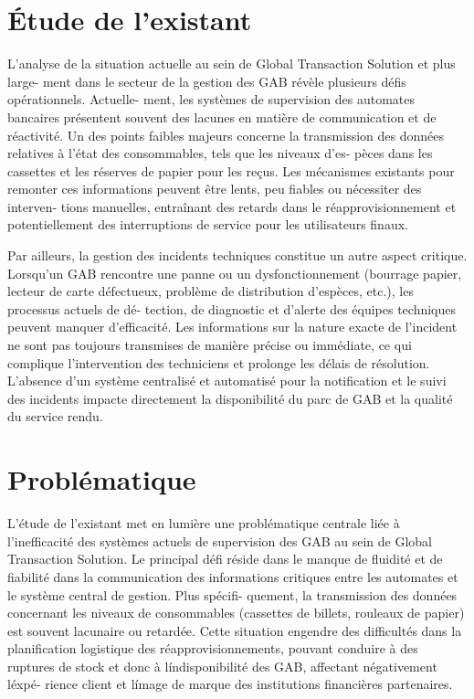 \documentclass[a4paper,15pt]{report}
\begin{document}
	
	\section{Étude de l’existant}
    \label{sec:existant}
	L’analyse de la situation actuelle au sein de Global Transaction Solution et plus large-
	ment dans le secteur de la gestion des GAB révèle plusieurs défis opérationnels. Actuelle-
	ment, les systèmes de supervision des automates bancaires présentent souvent des lacunes
	en matière de communication et de réactivité. Un des points faibles majeurs concerne la
	transmission des données relatives à l’état des consommables, tels que les niveaux d’es-
	pèces dans les cassettes et les réserves de papier pour les reçus. Les mécanismes existants
	pour remonter ces informations peuvent être lents, peu fiables ou nécessiter des interven-
	tions manuelles, entraînant des retards dans le réapprovisionnement et potentiellement
	des interruptions de service pour les utilisateurs finaux.
	
	Par ailleurs, la gestion des incidents techniques constitue un autre aspect critique.
	Lorsqu’un GAB rencontre une panne ou un dysfonctionnement (bourrage papier, lecteur
	de carte défectueux, problème de distribution d’espèces, etc.), les processus actuels de dé-
	tection, de diagnostic et d’alerte des équipes techniques peuvent manquer d’efficacité. Les
	informations sur la nature exacte de l’incident ne sont pas toujours transmises de manière
	précise ou immédiate, ce qui complique l’intervention des techniciens et prolonge les délais
	de résolution. L’absence d’un système centralisé et automatisé pour la notification et le
	suivi des incidents impacte directement la disponibilité du parc de GAB et la qualité du
	service rendu.

	
	\section{Problématique}
	\label{sec:problematique}
	L’étude de l’existant met en lumière une problématique centrale liée à l’inefficacité
	des systèmes actuels de supervision des GAB au sein de Global Transaction Solution. Le
	principal défi réside dans le manque de fluidité et de fiabilité dans la communication des
	informations critiques entre les automates et le système central de gestion. Plus spécifi-
	quement, la transmission des données concernant les niveaux de consommables (cassettes
	de billets, rouleaux de papier) est souvent lacunaire ou retardée. Cette situation engendre
	des difficultés dans la planification logistique des réapprovisionnements, pouvant conduire
	à des ruptures de stock et donc à líndisponibilité des GAB, affectant négativement léxpé-
	rience client et límage de marque des institutions financières partenaires.
	
\end{document}
